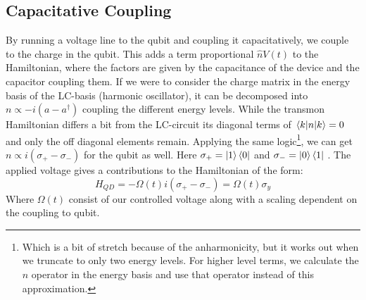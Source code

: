 \subsection{Capacitative Coupling}
By running a voltage line to the qubit and coupling it capacitatively, we couple to the charge in the qubit. This adds a term proportional $\hat{n}V(t)$ to the Hamiltonian, where the factors are given by the capacitance of the device and the capacitor coupling them. If we were to consider the charge matrix in the energy basis of the LC-basis (harmonic oscillator), it can be decomposed into $n \propto -i(a - a^\dagger)$ coupling the different energy levels. While the transmon Hamiltonian differs a bit from the LC-circuit its diagonal terms of $\mel{k}{n}{k} = 0$ and only the off diagonal elements remain. Applying the same logic\footnote{Which is a bit of stretch because of the anharmonicity, but it works out when we truncate to only two energy levels. For higher level terms, we calculate the $n$ operator in the energy basis and use that operator instead of this approximation.}, we can get $n \propto i(\sigma_+ - \sigma_-)$ for the qubit as well. Here $\sigma_+ = \ket{1}\bra{0}$ and $\sigma_- = \ket{0}\bra{1}$ \cite{krantz_quantum_2019}. The applied voltage gives a contributions to the Hamiltonian of the form:
\begin{equation}
    H_{QD} = - \Omega(t) i \left(\sigma_+ - \sigma_- \right) = \Omega(t) \sigma_y
\end{equation}
Where $\Omega(t)$ consist of our controlled voltage along with a scaling dependent on the coupling to qubit.  

